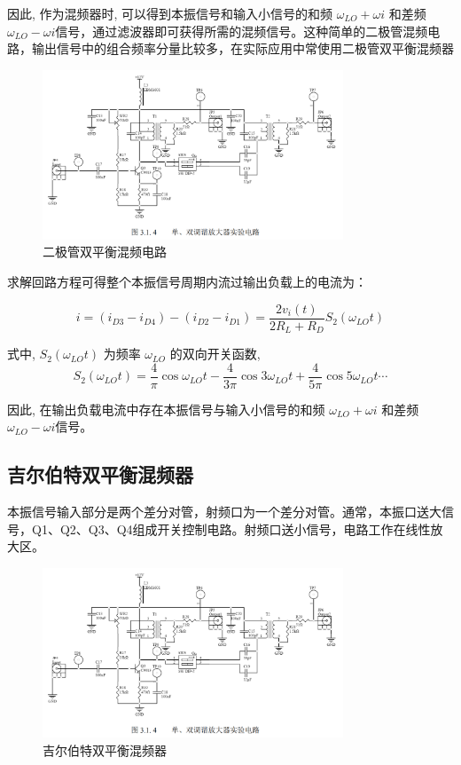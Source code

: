 \documentclass{../source/Experiment}
\begin{document}
    因此, 作为混频器时, 可以得到本振信号和输入小信号的和频 $\omega_{LO} + \omega i$ 和差频 $\omega_{LO} − \omega i$信号，通过滤波器即可获得所需的混频信号。这种简单的二极管混频电路，输出信号中的组合频率分量比较多，在实际应用中常使用二极管双平衡混频器
    \begin{figure}[H]
        \centering
        \includegraphics[width = 0.8\textwidth]{pic/fig2.png}
        \caption{二极管双平衡混频电路}
    \end{figure}

    求解回路方程可得整个本振信号周期内流过输出负载上的电流为：

    $$
    i=\left(i_{D 3}-i_{D 4}\right)-\left(i_{D 2}-i_{D 1}\right)=\frac{2 v_{i}(t)}{2 R_{L}+R_{D}} S_{2}\left(\omega_{L O} t\right)
    $$

    式中, $ S_2 (\omega_{LO}t)$ 为频率 $\omega_{LO}$ 的双向开关函数,
    $$
    S_{2}\left(\omega_{L O} t\right)=\frac{4}{\pi} \cos \omega_{L O} t-\frac{4}{3 \pi} \cos 3 \omega_{L O} t+\frac{4}{5 \pi} \cos 5 \omega_{L O} t \cdots
    $$

    因此, 在输出负载电流中存在本振信号与输入小信号的和频 $\omega_{LO} + \omega i$ 和差频 $\omega_{LO} − \omega i$信号。

    \subsection{吉尔伯特双平衡混频器}

    本振信号输入部分是两个差分对管，射频口为一个差分对管。通常，本振口送大信号，Q1、Q2、Q3、Q4组成开关控制电路。射频口送小信号，电路工作在线性放大区。

    \begin{figure}[H]
        \centering
        \includegraphics[width = 0.8\textwidth]{pic/fig2.png}
        \caption{吉尔伯特双平衡混频器}
    \end{figure}
\end{document}
